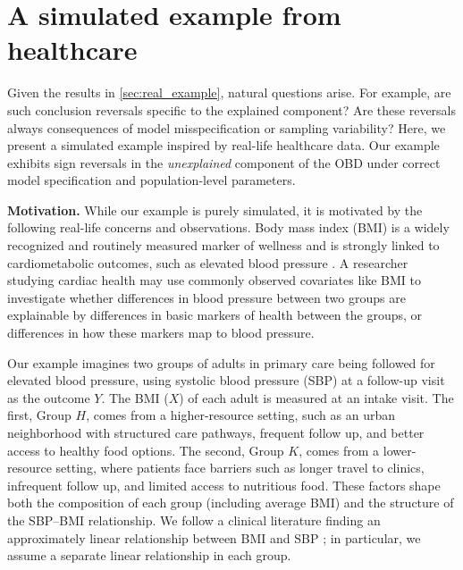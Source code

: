 \section{A simulated example from healthcare}
\label{sec:simulated_example}
Given the results in \cref{sec:real_example}, natural questions arise. For example, are such conclusion reversals specific to the explained component? Are these reversals always consequences of model misspecification or sampling variability? Here, we present a simulated example inspired by real-life healthcare data.
Our example exhibits sign reversals in the \emph{unexplained} component of the OBD under correct model specification and population-level parameters.


\textbf{Motivation.}
While our example is purely simulated, it is motivated by the following real-life concerns and observations.
Body mass index (BMI) is a widely recognized and routinely measured marker of wellness \cite{heymsfield2016} and is strongly linked to cardiometabolic outcomes, such as elevated blood pressure \cite{brown2000body}.
A researcher studying cardiac health may use commonly observed covariates like BMI to investigate whether differences in blood pressure between two groups are explainable by differences in basic markers of health between the groups, or differences in how these markers map to blood pressure.

Our example imagines two groups of adults in primary care being followed for elevated blood pressure, using systolic blood pressure (SBP) at a follow-up visit as the outcome $Y$. The BMI ($X$) of each adult is measured at an intake visit.
The first, Group $H$, comes from a higher-resource setting, such as an urban neighborhood with structured care pathways, frequent follow up, and better access to healthy food options. 
The second, Group $K$, comes from a lower-resource setting, where patients face barriers such as longer travel to clinics, infrequent follow up, and limited access to nutritious food.
These factors shape both the composition of each group (including average BMI) and the structure of the SBP--BMI relationship. We follow a clinical literature finding an approximately linear relationship between BMI and SBP \cite{kaufman1997, cappuccio2008, chen2023}; in particular, we assume a separate linear relationship in each group.

